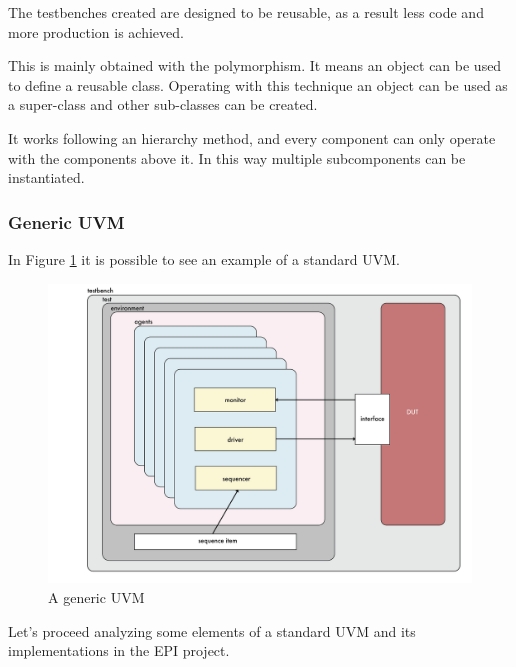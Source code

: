 The testbenches created are designed to be reusable, as a result less code and more production is achieved.

This is mainly obtained with the polymorphism. It means an object can be used to define a reusable class. Operating with this technique an object can be used as a super-class and other sub-classes can be created.

It works following an hierarchy method, and every component can only operate with the components above it. In this way multiple subcomponents can be instantiated.

\subsubsection{Generic UVM}
In Figure \ref{gen-uvm} it is possible to see an example of a standard UVM.

\begin{figure}[H]
    \centering
    \includegraphics[scale = 0.4]{Chapter_1/img/general-uvm.png}
    \caption{A generic UVM}
    \label{gen-uvm}
\end{figure}

Let's proceed analyzing some elements of a standard UVM and its implementations in the EPI project.

